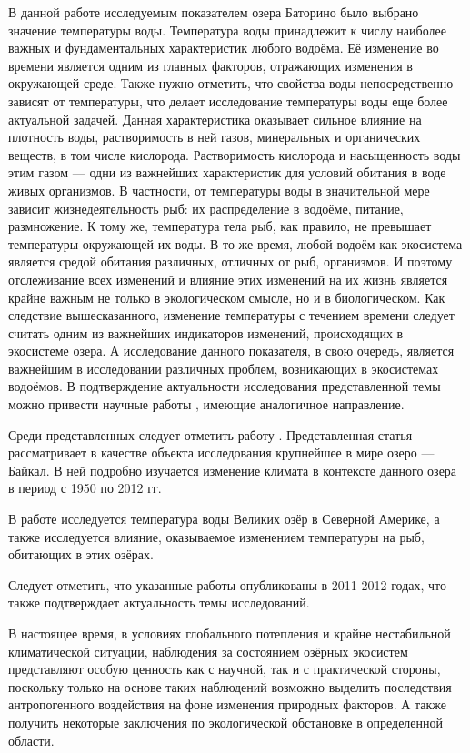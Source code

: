 В данной работе исследуемым показателем озера Баторино было выбрано значение температуры воды. Температура воды принадлежит к числу наиболее важных и фундаментальных характеристик любого водоёма. Её изменение во времени является одним из главных факторов, отражающих изменения в окружающей среде. Также нужно отметить, что свойства воды непосредственно зависят от температуры, что делает исследование температуры воды еще более актуальной задачей. Данная характеристика оказывает сильное влияние на плотность воды, растворимость в ней газов, минеральных и органических веществ, в том числе кислорода. Растворимость кислорода и насыщенность воды этим газом --- одни из важнейших характеристик для условий обитания в воде живых организмов. В частности, от температуры воды в значительной мере зависит жизнедеятельность рыб: их распределение в водоёме, питание, размножение. К тому же, температура тела рыб, как правило, не превышает температуры окружающей их воды. В то же время, любой водоём как экосистема является средой обитания различных, отличных от рыб, организмов. И поэтому отслеживание всех изменений и влияние этих изменений на их жизнь является крайне важным не только в экологическом смысле, но и в биологическом. Как следствие вышесказанного, изменение температуры с течением времени следует считать одним из важнейших индикаторов изменений, происходящих в экосистеме озера. А исследование данного показателя, в свою очередь, является важнейшим в исследовании различных проблем, возникающих в экосистемах водоёмов. В подтверждение актуальности исследования представленной темы можно привести научные работы \cite{Katz2011,OBrien2012a,Subehi2011}, имеющие аналогичное направление.

Среди представленных следует отметить работу \cite{Katz2011}. Представленная статья рассматривает в качестве объекта исследования крупнейшее в мире озеро --- Байкал. В ней подробно изучается изменение климата в контексте данного озера в период с 1950 по 2012 гг.

В работе \cite{OBrien2012a} исследуется температура воды Великих озёр в Северной Америке, а также исследуется влияние, оказываемое изменением температуры на рыб, обитающих в этих озёрах.

Следует отметить, что указанные работы опубликованы в 2011-2012 годах, что также подтверждает актуальность темы исследований.

В настоящее время, в условиях глобального потепления и крайне нестабильной климатической ситуации, наблюдения за состоянием озёрных экосистем представляют особую ценность как с научной, так и с практической стороны, поскольку только на основе таких наблюдений возможно выделить последствия антропогенного воздействия на фоне изменения природных факторов. А также получить некоторые заключения по экологической обстановке в определенной области.

